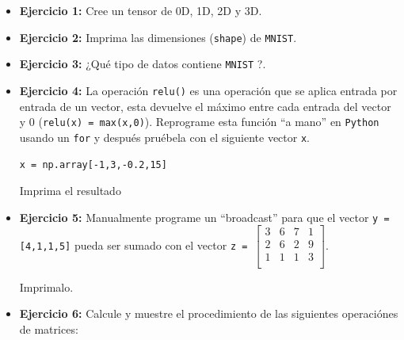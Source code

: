 \documentclass[spanish,12pt]{report}
\begin{document}
\begin{itemize}

\item {\bf{\color{Red} Ejercicio 1:}}  {\sf [5 puntos]}  Cree un tensor de 0D, 1D, 2D y 3D.

\item {\bf{\color{Red} Ejercicio 2:}}  {\sf [5 puntos]}  Imprima las dimensiones ({\tt shape}) de {\tt MNIST}.

\item {\bf{\color{Red} Ejercicio 3:}} {\sf [5 puntos]} ¿Qué tipo de datos contiene {\tt MNIST} ?.




\item {\bf{\color{Red} Ejercicio 4:}} {\sf [20 puntos]}	La operación {\tt relu()} es una operación que se aplica entrada por entrada de un vector, esta devuelve el máximo entre cada entrada del vector y 0 ({\tt relu(x) = max(x,0)}). Reprograme esta función “a mano” en {\tt Python} usando un {\tt for} y después pruébela con el siguiente vector {\tt x}. 
\begin{center}
    {\tt x = np.array[-1,3,-0.2,15]}
\end{center}
Imprima el resultado


\item {\bf{\color{Red} Ejercicio 5:}} {\sf [15 puntos]} 	Manualmente programe un “broadcast” para que el vector {\tt y = [4,1,1,5]} pueda ser sumado con el vector {\tt z = $\begin{bmatrix}
   3 & 6 & 7 & 1 \\
   2 & 6 & 2 & 9 \\
   1 & 1 & 1 & 3 \\
\end{bmatrix}$}.

Imprimalo.

\item {\bf{\color{Red} Ejercicio 6:}} {\sf [30 puntos]}	Calcule y muestre el procedimiento de las siguientes operaciónes de matrices:


\end{itemize}
\end{document}

